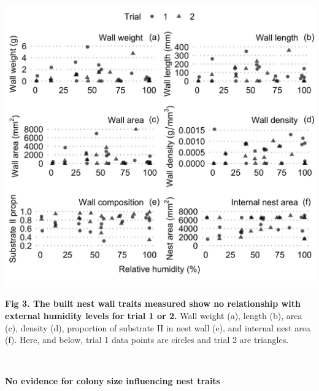 \documentclass[3p]{elsarticle} %
\begin{document}
\begin{flushleft}\includegraphics[width=1\linewidth,height=0.75\textheight]{../figures/Fig3} \end{flushleft}

\textbf{Fig 3. The built nest wall traits measured show no relationship
with external humidity levels for trial 1 or 2.} Wall weight (a), length
(b), area (c), density (d), proportion of substrate II in nest wall (e),
and internal nest area (f). Here, and below, trial 1 data points are
circles and trial 2 are triangles.

~

\textbf{No evidence for colony size influencing nest traits}
\end{document}
